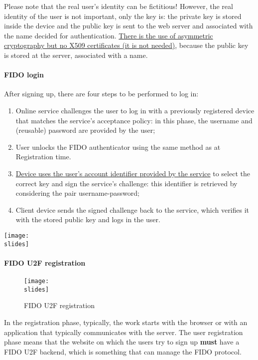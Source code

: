 \vspace*{5mm}
Please note that the real user's identity can be fictitious! However, the real identity of the user is not important, only the key is: the private key is stored inside the device and the public key is sent to the web server and associated with the name decided for authentication. \ul{There is the use of asymmetric cryptography but no X509 certificates (it is not needed)}, because the public key is stored at the server, associated with a name.



\paragraph{FIDO login}

After signing up, there are four steps to be performed to log in:

\noindent
\begin{minipage}{0.4\textwidth}
  \begin{enumerate}
    \item Online service challenges the user to log in with a previously registered device that matches the service's acceptance policy: in this phase, the username and (reusable) password are provided by the user;
    \item User unlocks the FIDO authenticator using the same method as at Registration time.
    \item \underline{Device uses the user's account identifier provided by the service} to select the correct key and sign the service's challenge: this identifier is retrieved by considering the pair username-password;
    \item Client device sends the signed challenge back to the service, which verifies it with the stored public key and logs in the user.
  \end{enumerate}
\end{minipage}
\hspace{0.05\textwidth}
\begin{minipage}{0.5\textwidth}
  \centering
  \texttt{[image: \\slides]}
\end{minipage}


\paragraph*{FIDO U2F registration}
\begin{figure}[h]
  \centering
  \texttt{[image: \\slides]}
  \caption{FIDO U2F registration}
\end{figure}
In the registration phase, typically, the work starts with the browser or with an application that typically communicates with the server. The user registration phase means that the website on which the users try to sign up \textbf{must} have a FIDO U2F backend, which is something that can manage the FIDO protocol.

